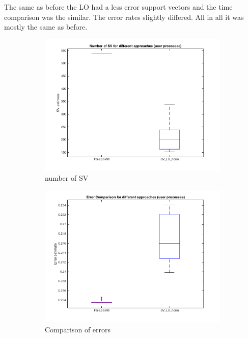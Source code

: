 \documentclass[11pt,oneside,a4paper]{article}
\begin{document}
The same as before the LO had a less error support vectors and the time comparison was the similar. The error rates slightly differed. All in all it was mostly the same as before. 
\begin{figure}[H]
	\begin{subfigure}[b]{0.4\textwidth}
		\includegraphics[width=\textwidth]{../Figures/sv_c}
		\caption{number of SV}
	\end{subfigure}
	\begin{subfigure}[b]{0.4\textwidth}
		\includegraphics[width=\textwidth]{../Figures/error_c}
		\caption{Comparison of errors}
	\end{subfigure}
	\begin{subfigure}[b]{0.4\textwidth}

\end{subfigure}
\end{figure}
\end{document}
